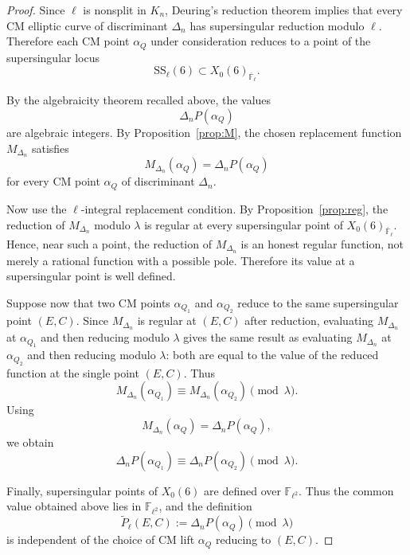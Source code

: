 \documentclass[12pt]{amsart}
\theoremstyle{definition}
\theoremstyle{remark}
\begin{document}
\begin{proof}
Since $\ell$ is nonsplit in $K_n$, Deuring's reduction theorem implies
that every CM elliptic curve of discriminant $\Delta_n$ has
supersingular reduction modulo $\ell$.  Therefore each CM point
$\alpha_Q$ under consideration reduces to a point of the supersingular
locus
\[
        \mathrm{SS}_\ell(6)\subset X_0(6)_{\overline{\mathbb{F}}_\ell}.
\]

By the algebraicity theorem recalled above, the values
\[
        \Delta_n P(\alpha_Q)
\]
are algebraic integers.  By Proposition~\ref{prop:M},
the chosen replacement function $M_{\Delta_n}$ satisfies
\[
        M_{\Delta_n}(\alpha_Q)=\Delta_n P(\alpha_Q)
\]
for every CM point $\alpha_Q$ of discriminant $\Delta_n$.

Now use the $\ell$-integral replacement condition.  By
Proposition~\ref{prop:reg}, the reduction of
$M_{\Delta_n}$ modulo $\lambda$ is regular at every supersingular point
of $X_0(6)_{\overline{\mathbb{F}}_\ell}$.  Hence, near such a point, the
reduction of $M_{\Delta_n}$ is an honest regular function, not merely a
rational function with a possible pole.  Therefore its value at a
supersingular point is well defined.

Suppose now that two CM points $\alpha_{Q_1}$ and $\alpha_{Q_2}$ reduce
to the same supersingular point $(E,C)$.  Since
$M_{\Delta_n}$ is regular at $(E,C)$ after reduction, evaluating
$M_{\Delta_n}$ at $\alpha_{Q_1}$ and then reducing modulo $\lambda$ gives
the same result as evaluating $M_{\Delta_n}$ at $\alpha_{Q_2}$ and then
reducing modulo $\lambda$: both are equal to the value of the reduced
function at the single point $(E,C)$.  Thus
\[
        M_{\Delta_n}(\alpha_{Q_1})
        \equiv
        M_{\Delta_n}(\alpha_{Q_2})
        \pmod{\lambda}.
\]
Using
\[
        M_{\Delta_n}(\alpha_Q)=\Delta_n P(\alpha_Q),
\]
we obtain
\[
        \Delta_n P(\alpha_{Q_1})
        \equiv
        \Delta_n P(\alpha_{Q_2})
        \pmod{\lambda}.
\]

Finally, supersingular points of $X_0(6)$ are defined over
$\mathbb{F}_{\ell^2}$.  Thus the common value obtained above lies in
$\mathbb{F}_{\ell^2}$, and the definition
\[
        \widetilde{P}_\ell(E,C)
        :=
        \Delta_n P(\alpha_Q)\pmod{\lambda}
\]
is independent of the choice of CM lift $\alpha_Q$ reducing to $(E,C)$.
\end{proof}
\end{document}
